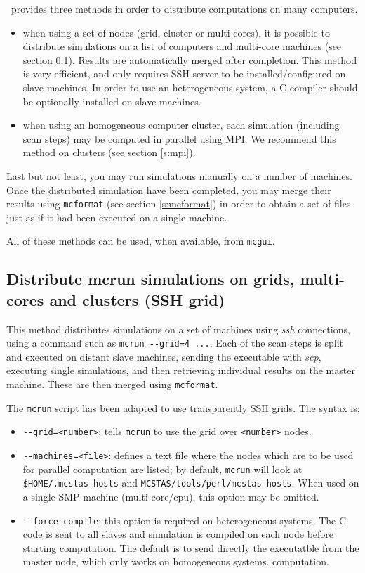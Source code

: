 \MCS\ provides three methods in order to distribute computations on many
computers.
\begin{itemize}
\item when using a set of nodes (grid, cluster or multi-cores), it is possible
  to distribute simulations on a list of computers and multi-core machines (see
  section \ref{s:ssh-grid}). Results are automatically merged after completion.
  This method is very efficient, and only requires SSH server to be
  installed/configured on slave machines.  In order to use an heterogeneous
  system, a C compiler should be optionally installed on slave machines.
\item when using an homogeneous computer cluster, each simulation (including
  scan steps) may be computed in parallel using MPI. We recommend this method on
  clusters (see section \ref{s:mpi}).
\end{itemize}

Last but not least, you may run simulations manually on a number of machines.
Once the distributed simulation have been completed, you may merge their results
using \verb+mcformat+ (see section \ref{s:mcformat})  in
order to obtain a set of files just as if it had been executed on a single
machine.

All of these methods can be used, when available, from \texttt{mcgui}.

\subsection{Distribute mcrun simulations on grids, multi-cores and clusters (SSH grid)}
\label{s:ssh-grid}
This method distributes simulations on a set of machines using \emph{ssh}
connections, using a command such as \verb+mcrun --grid=4 ...+.  Each of the
scan steps is split and executed on distant slave machines, sending the
executable with \emph{scp}, executing single simulations, and then retrieving
individual results on the master machine. These are then merged using
\texttt{mcformat}.

The \verb'mcrun' script has been adapted to use transparently SSH grids. The
syntax is:
\begin{itemize}
\item \verb'--grid=<number>': tells \verb'mcrun' to use the grid over \verb'<number>' nodes.
\item \verb'--machines=<file>': defines a text file where the nodes which are to
  be used for parallel computation are listed; by default, \verb'mcrun' will
  look at \verb'$HOME/.mcstas-hosts' and
  \verb'MCSTAS/tools/perl/mcstas-hosts'. When used on a single SMP machine
  (multi-core/cpu), this option may be omitted.
\item \verb'--force-compile': this option is required on heterogeneous systems.
  The C code is sent to all slaves and simulation is compiled on each node
  before starting computation. The default is to send directly the executatble
  from the master node, which only works on homogeneous systems.  computation.
\end{itemize}

